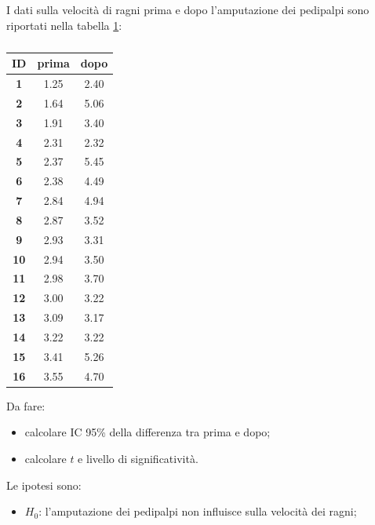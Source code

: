 \documentclass[10pt, draft]{book}
\newcounter{example}[section]
\begin{document}
\begin{example}\label{esamputazione}
    I dati sulla velocità di ragni prima e dopo l'amputazione dei pedipalpi sono riportati nella tabella \ref{tabamputazione}:
    \begin{table}[H]
        \centering
        \renewcommand\arraystretch{1.2}
        \begin{tabular}{c|c|c}
        \hline
        \textbf{ID} & \textbf{prima} & \textbf{dopo}\\ 
        \hline
        \textbf{1} & 1.25 & 2.40\\
        \hline
        \textbf{2} & 1.64 & 5.06\\
        \hline
        \textbf{3} & 1.91 & 3.40\\
        \hline
        \textbf{4} & 2.31 & 2.32\\
        \hline
        \textbf{5} & 2.37 & 5.45\\
        \hline
        \textbf{6} & 2.38 & 4.49\\
        \hline
        \textbf{7} & 2.84 & 4.94\\
        \hline
        \textbf{8} & 2.87 & 3.52\\
        \hline
        \textbf{9} & 2.93 & 3.31\\
        \hline
        \textbf{10} & 2.94 & 3.50\\
        \hline
        \textbf{11} & 2.98 & 3.70\\
        \hline
        \textbf{12} & 3.00 & 3.22\\
        \hline
        \textbf{13} & 3.09 & 3.17\\
        \hline
        \textbf{14} & 3.22 & 3.22\\
        \hline
        \textbf{15} & 3.41 & 5.26\\
        \hline
        \textbf{16} & 3.55 & 4.70\\
        \hline
        \end{tabular}
        \caption{\small{}}
        \label{tabamputazione}
    \end{table}\noindent
    Da fare:
    \begin{itemize}
        \item calcolare IC 95\% della differenza tra prima e dopo;
        \item calcolare $t$ e livello di significatività.
    \end{itemize}
    Le ipotesi sono:
    \begin{itemize}
        \item $H_0$: l'amputazione dei pedipalpi non influisce sulla velocità dei ragni;

\end{itemize}
\end{example}
\end{document}

